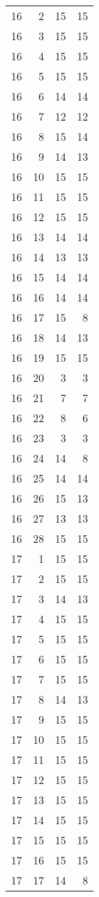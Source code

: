 \documentclass[
]{article}
\begin{document}
\begin{longtable}[]{@{}rrrr@{}}
16 & 2 & 15 & 15 \\
16 & 3 & 15 & 15 \\
16 & 4 & 15 & 15 \\
16 & 5 & 15 & 15 \\
16 & 6 & 14 & 14 \\
16 & 7 & 12 & 12 \\
16 & 8 & 15 & 14 \\
16 & 9 & 14 & 13 \\
16 & 10 & 15 & 15 \\
16 & 11 & 15 & 15 \\
16 & 12 & 15 & 15 \\
16 & 13 & 14 & 14 \\
16 & 14 & 13 & 13 \\
16 & 15 & 14 & 14 \\
16 & 16 & 14 & 14 \\
16 & 17 & 15 & 8 \\
16 & 18 & 14 & 13 \\
16 & 19 & 15 & 15 \\
16 & 20 & 3 & 3 \\
16 & 21 & 7 & 7 \\
16 & 22 & 8 & 6 \\
16 & 23 & 3 & 3 \\
16 & 24 & 14 & 8 \\
16 & 25 & 14 & 14 \\
16 & 26 & 15 & 13 \\
16 & 27 & 13 & 13 \\
16 & 28 & 15 & 15 \\
17 & 1 & 15 & 15 \\
17 & 2 & 15 & 15 \\
17 & 3 & 14 & 13 \\
17 & 4 & 15 & 15 \\
17 & 5 & 15 & 15 \\
17 & 6 & 15 & 15 \\
17 & 7 & 15 & 15 \\
17 & 8 & 14 & 13 \\
17 & 9 & 15 & 15 \\
17 & 10 & 15 & 15 \\
17 & 11 & 15 & 15 \\
17 & 12 & 15 & 15 \\
17 & 13 & 15 & 15 \\
17 & 14 & 15 & 15 \\
17 & 15 & 15 & 15 \\
17 & 16 & 15 & 15 \\
17 & 17 & 14 & 8 \\

\end{longtable}
\end{document}
